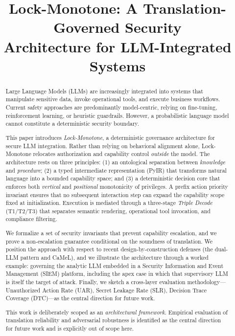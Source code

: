 \documentclass[conference]{IEEEtran}
\begin{document}
\title{Lock-Monotone: A Translation-Governed Security\\
Architecture for LLM-Integrated Systems}

\author{
}

\maketitle

\begin{abstract}
Large Language Models (LLMs) are increasingly integrated into systems
that manipulate sensitive data, invoke operational tools, and execute
business workflows. Current safety approaches are predominantly
model-centric, relying on fine-tuning, reinforcement learning, or
heuristic guardrails. However, a probabilistic language model cannot
constitute a deterministic security boundary.

This paper introduces \emph{Lock-Monotone}, a deterministic governance
architecture for secure LLM integration. Rather than relying on
behavioral alignment alone, Lock-Monotone relocates authorization and
capability control \emph{outside} the model. The architecture rests on
three principles: (1) an ontological separation between \emph{knowledge}
and \emph{procedure}; (2) a typed intermediate representation (PyIR) that
transforms natural language into a bounded capability space; and (3) a
deterministic decision core that enforces both \emph{vertical} and
\emph{positional} monotonicity of privileges. A prefix action priority
invariant ensures that no subsequent interaction step can expand the
capability scope fixed at initialization. Execution is mediated through a
three-stage \emph{Triple Decode} (T1/T2/T3) that separates semantic
rendering, operational tool invocation, and compliance filtering.

We formalize a set of security invariants that prevent capability
escalation, and we prove a non-escalation guarantee conditional on the
soundness of translation. We position the approach with respect to recent
design-by-construction defenses (the dual-LLM pattern and CaMeL), and we
illustrate the architecture through a worked example: governing the
analytic LLM embedded in a Security Information and Event Management
(SIEM) platform, including the apex case in which that supervisory LLM is
itself the target of attack. Finally, we sketch a cross-layer evaluation
methodology---Unauthorized Action Rate (UAR), Secret Leakage Rate (SLR),
Decision Trace Coverage (DTC)---as the central direction for future work.

This work is deliberately scoped as an \emph{architectural framework}.
Empirical evaluation of translation reliability and adversarial
robustness is identified as the central direction for future work and is
explicitly out of scope here.
\end{abstract}
\end{document}
